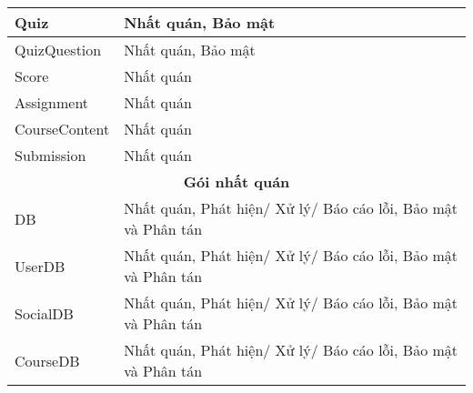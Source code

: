 \documentclass[./../main_file.tex]{subfiles}
\begin{document}
\begin{longtable}{|p{}|p{}|}
			Quiz                                  & Nhất quán, Bảo mật                                            \\ \hline
			QuizQuestion                          & Nhất quán, Bảo mật                                            \\ \hline
			Score                                 & Nhất quán                                                     \\ \hline
			Assignment                            & Nhất quán                                                     \\ \hline
			CourseContent                         & Nhất quán                                                     \\ \hline
			Submission                            & Nhất quán                                                     \\ \hline
			\multicolumn{2}{|c|}{\textbf{Gói nhất quán}}                                                          \\ \hline
			DB                                    & Nhất quán, Phát hiện/ Xử lý/ Báo cáo lỗi, Bảo mật và Phân tán \\ \hline
			UserDB                                & Nhất quán, Phát hiện/ Xử lý/ Báo cáo lỗi, Bảo mật và Phân tán \\ \hline
			SocialDB                              & Nhất quán, Phát hiện/ Xử lý/ Báo cáo lỗi, Bảo mật và Phân tán \\ \hline
			CourseDB                              & Nhất quán, Phát hiện/ Xử lý/ Báo cáo lỗi, Bảo mật và Phân tán \\ \hline
	\end{longtable}
\end{document}
